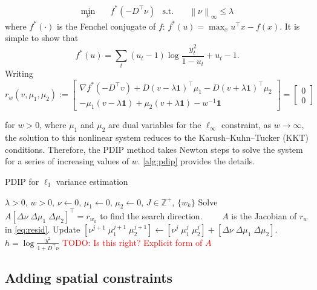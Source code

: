 \documentclass{article}
\newcommand{\attn}[1]{\textcolor{red}{TODO: #1}}
\newcommand{\one}{\mathbf{1}}
\newcommand{\norm}[1]{\left\lVert #1 \right\rVert}
\begin{document}
\begin{align}
\min_\nu&\quad f^*(-D^\top\nu) & \mbox{s.t.}&\quad \norm{ \nu }_\infty \le \lambda
\end{align}
 where $f^*(\cdot)$ is the Fenchel conjugate of $f$: $f^*(u)=\max_x
 u^\top x-f(x)$. It is simple to show that 
\begin{equation}
f^*(u)=\sum_t (u_t-1)\log\frac{y_t^2}{1-u_t} + u_t-1.
\label{eq:conj}
\end{equation}
Writing
\begin{equation}
  r_w(v,\mu_1,\mu_2):=
  \begin{bmatrix}
    \nabla f^*(-D^\top v) + D(v-\lambda \one)^\top \mu_1 -
    D(v+\lambda \one)^\top \mu_2\\
    -\mu_1(v-\lambda\one)+\mu_2(v + \lambda\one) -w^{-1}\one
  \end{bmatrix}
  =
  \begin{bmatrix}
  0\\0\end{bmatrix}
\label{eq:resid}
\end{equation}

for $w>0$, where $\mu_1$ and $\mu_2$ are dual variables for the
$\ell_\infty$ constraint, as $w\rightarrow\infty$,
the solution to this nonlinear system reduces to the Karush–Kuhn–Tucker (KKT)
conditions. Therefore, the PDIP method takes Newton steps to solve the
system for a series of increasing values of $w$. \autoref{alg:pdip}
provides the details. 

\begin{algorithm}[tb]
  \caption{PDIP for $\ell_1$ variance estimation}
  \label{alg:pdip}
  \begin{algorithmic}
    \REQUIRE $\lambda>0$, $w>0$, $\nu\leftarrow 0$, $\mu_1\leftarrow
    0$, $\mu_2\leftarrow 0$, $J\in\mathbb{Z}^+$, $\{w_k\}$
    \STATE Solve $A [\Delta\nu\; \Delta\mu_1\; \Delta\mu_2]^\top=r_{w_k}$ to find the search direction.
    \STATE $\quad\quad A$ is the Jacobian of $r_w$ in \eqref{eq:resid}.
    \STATE Update $[\nu^{j+1}\; \mu^{j+1}_1\; \mu^{j+1}_2] \leftarrow
    [\nu^{j}\; \mu^{j}_1\; \mu^{j}_2] + [\Delta\nu\; \Delta\mu_1\;
    \Delta\mu_2]$. 
    \ENDFOR
   \ENDFOR
   \RETURN $h=\log\frac{y^2}{1+D^\top\nu}$ \attn{Is this right?
     Explicit form of $A$}
  \end{algorithmic}
\end{algorithm}


\subsection{Adding spatial constraints}
\label{sec:exten}
\end{document}

